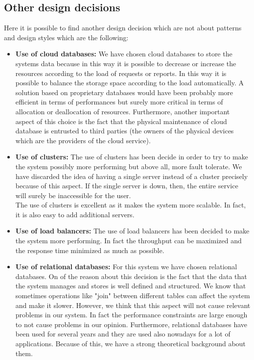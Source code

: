 \documentclass[titlepage]{article}
\begin{document}
\subsection{Other design decisions}
Here it is possible to find another design decision which are not about patterns and design styles which are the following:
\begin{itemize}
	\item \textbf{ Use of cloud databases:} We have chosen cloud databases to store the systems data because in this way it is possible to decrease or increase the resources according to the load of requests or reports. In this way it is possible to balance the storage space according to the load automatically. A solution based on proprietary databases would have been probably more efficient in terms of performances but surely more critical in terms of allocation or deallocation of resources. Furthermore, another important aspect of this choice is the fact that the physical maintenance of cloud database is entrusted to third parties (the owners of the physical devices which are the providers of the cloud service).
	\item \textbf{Use of clusters:} The use of clusters has been decide in order to try to make the system possibly more performing but above all, more fault tolerate. We have discarded the idea of having a single server instead of a cluster precisely because of this aspect. If the single server is down, then, the entire service will surely be inaccessible for the user. \\
The use of clusters is excellent as it makes the system more scalable. In fact, it is also easy to add additional servers.
	\item \textbf{Use of load balancers:} The use of load balancers has been decided to make the system more performing. In fact the throughput can be maximized and the response time minimized as much as possible. 
	\item \textbf{Use of relational databases:} For this system we have chosen relational databases. On of the reason about this decision is the fact that the data that the system manages and stores is well defined and structured. We know that sometimes operations like "join" between different tables can affect the system and make it slower. However, we think that this aspect will not cause relevant problems in our system. In fact the performance constraints are large enough to not cause problems in our opinion. Furthermore, relational databases have been used for several years and they are used also nowadays for a lot of applications. Because of this, we have a strong theoretical background about them.
	
\end{itemize}
\end{document}
